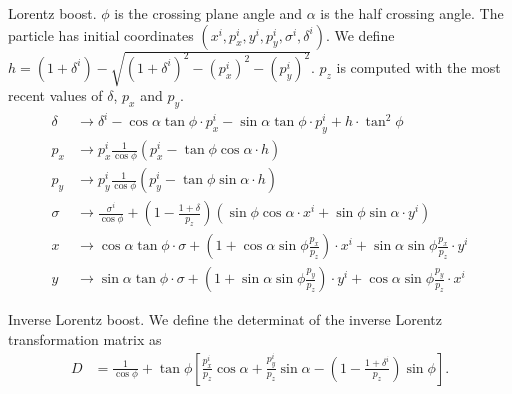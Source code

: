 \documentclass[english]{article}
\begin{document}
Lorentz boost. $\phi$ is the crossing plane angle and $\alpha$ is the half crossing angle. The particle has initial coordinates $(x^i,p_x^i,y^i,p_y^i,\sigma^i,\delta^i)$.
We define $h=(1+\delta^i)-\sqrt{(1+\delta^i)^2-(p_x^i)^2-(p_y^i)^2}$. $p_z$ is computed with the most recent values of $\delta$, $p_x$ and $p_y$.
\begin{align}
    \delta &\to \delta^i - \cos\alpha\tan\phi\cdot p_x^i - \sin\alpha\tan\phi\cdot p_y^i + h\cdot\tan^2\phi \\
    p_x &\to p_x^i \frac{1}{\cos\phi}\left(p_x^i-\tan\phi\cos\alpha\cdot h\right) \\
    p_y &\to p_y^i \frac{1}{\cos\phi}\left(p_y^i-\tan\phi\sin\alpha\cdot h\right) \\
    \sigma &\to \frac{\sigma^i}{\cos\phi} + \left(1-\frac{1+\delta}{p_z}\right)\left(\sin\phi\cos\alpha\cdot x^i+\sin\phi\sin\alpha\cdot y^i\right) \\
    x &\to \cos\alpha\tan\phi\cdot\sigma + \left(1+\cos\alpha\sin\phi\frac{p_x}{p_z}\right)\cdot x^i +\sin\alpha\sin\phi\frac{p_x}{p_z}\cdot y^i \\
    y &\to \sin\alpha\tan\phi\cdot\sigma + \left(1+\sin\alpha\sin\phi\frac{p_y}{p_z}\right)\cdot y^i +\cos\alpha\sin\phi\frac{p_y}{p_z}\cdot x^i
\end{align}

Inverse Lorentz boost. We define the determinat of the inverse Lorentz transformation matrix as
\begin{align}
    D &= \frac{1}{\cos\phi} + \tan\phi \left[\frac{p_x^i}{p_z}\cos\alpha+\frac{p_y^i}{p_z}\sin\alpha-\left(1-\frac{1+\delta^i}{p_z}\right)\sin\phi\right].
\end{align}
\end{document}
